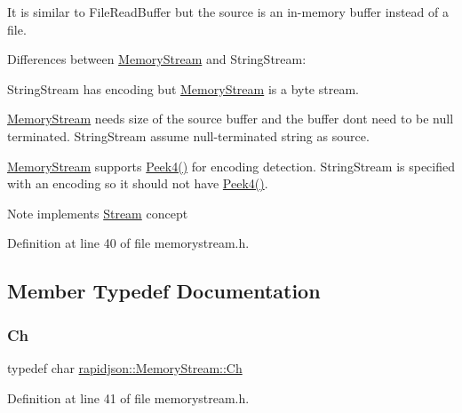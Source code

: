It is similar to File\+Read\+Buffer but the source is an in-\/memory buffer instead of a file.

Differences between \mbox{\hyperlink{structrapidjson_1_1_memory_stream}{Memory\+Stream}} and String\+Stream\+:
\begin{DoxyEnumerate}
\item String\+Stream has encoding but \mbox{\hyperlink{structrapidjson_1_1_memory_stream}{Memory\+Stream}} is a byte stream.
\item \mbox{\hyperlink{structrapidjson_1_1_memory_stream}{Memory\+Stream}} needs size of the source buffer and the buffer don\textquotesingle{}t need to be null terminated. String\+Stream assume null-\/terminated string as source.
\item \mbox{\hyperlink{structrapidjson_1_1_memory_stream}{Memory\+Stream}} supports \mbox{\hyperlink{structrapidjson_1_1_memory_stream_ad17be8ddf7b91d91b70fe1cdf5478d14}{Peek4()}} for encoding detection. String\+Stream is specified with an encoding so it should not have \mbox{\hyperlink{structrapidjson_1_1_memory_stream_ad17be8ddf7b91d91b70fe1cdf5478d14}{Peek4()}}. \begin{DoxyNote}{Note}
implements \mbox{\hyperlink{classrapidjson_1_1_stream}{Stream}} concept 
\end{DoxyNote}

\end{DoxyEnumerate}

Definition at line 40 of file memorystream.\+h.



\subsection{Member Typedef Documentation}
\mbox{\label{structrapidjson_1_1_memory_stream_abf9f7cf51a5830ae45e24f5d55fdceaf}} 
\subsubsection{\texorpdfstring{Ch}{Ch}}
{\footnotesize\ttfamily typedef char \mbox{\hyperlink{structrapidjson_1_1_memory_stream_abf9f7cf51a5830ae45e24f5d55fdceaf}{rapidjson\+::\+Memory\+Stream\+::\+Ch}}}



Definition at line 41 of file memorystream.\+h.



